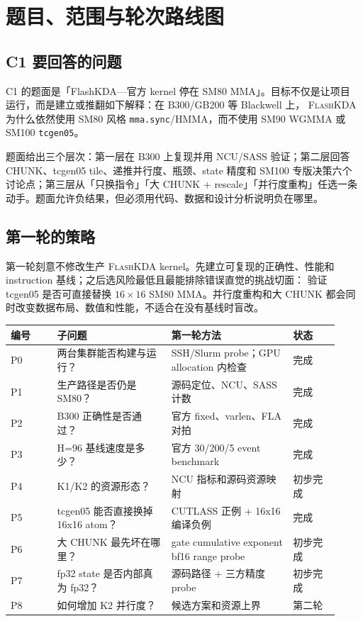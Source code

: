 \documentclass[11pt,a4paper,fontset=none]{ctexart}
\newcommand{\FlashKDA}{\textsc{FlashKDA}}
\newcommand{\code}[1]{\texttt{#1}}
\begin{document}
\tableofcontents
\clearpage

\section{题目、范围与轮次路线图}

\subsection{C1 要回答的问题}

C1 的题面是「FlashKDA---官方 kernel 停在 SM80 MMA」。目标不仅是让项目
运行，而是建立或推翻如下解释：在 B300/GB200 等 Blackwell 上，
\FlashKDA{} 为什么依然使用 SM80 风格 \code{mma.sync}/HMMA，而不使用
SM90 WGMMA 或 SM100 \code{tcgen05}。

题面给出三个层次：第一层在 B300 上复现并用 NCU/SASS 验证；第二层回答
CHUNK、tcgen05 tile、递推并行度、瓶颈、state 精度和 SM100 专版决策六个
讨论点；第三层从「只换指令」「大 CHUNK + rescale」「并行度重构」任选一条
动手。题面允许负结果，但必须用代码、数据和设计分析说明负在哪里。

\subsection{第一轮的策略}

第一轮刻意不修改生产 \FlashKDA{} kernel。先建立可复现的正确性、性能和
instruction 基线；之后选风险最低且最能排除错误直觉的挑战切面：
验证 tcgen05 是否可直接替换 \(16\times16\) SM80 MMA。并行度重构和大 CHUNK
都会同时改变数据布局、数值和性能，不适合在没有基线时盲改。

\begin{longtable}{@{}L{0.13\linewidth}L{0.32\linewidth}L{0.34\linewidth}L{0.13\linewidth}@{}}
\toprule
编号 & 子问题 & 第一轮方法 & 状态 \\
\midrule
\endhead
\bottomrule
\endlastfoot
P0 & 两台集群能否构建与运行？ & SSH/Slurm probe；GPU allocation 内检查 & 完成 \\
P1 & 生产路径是否仍是 SM80？ & 源码定位、NCU、SASS 计数 & 完成 \\
P2 & B300 正确性是否通过？ & 官方 fixed、varlen、FLA 对拍 & 完成 \\
P3 & H=96 基线速度是多少？ & 官方 30/200/5 event benchmark & 完成 \\
P4 & K1/K2 的资源形态？ & NCU 指标和源码资源映射 & 初步完成 \\
P5 & tcgen05 能否直接换掉 16x16 atom？ & CUTLASS 正例 + 16x16 编译负例 & 完成 \\
P6 & 大 CHUNK 最先坏在哪里？ & gate cumulative exponent bf16 range probe & 初步完成 \\
P7 & fp32 state 是否内部真为 fp32？ & 源码路径 + 三方精度 probe & 初步完成 \\
P8 & 如何增加 K2 并行度？ & 候选方案和资源上界 & 第二轮 \\
\end{longtable}
\end{document}
